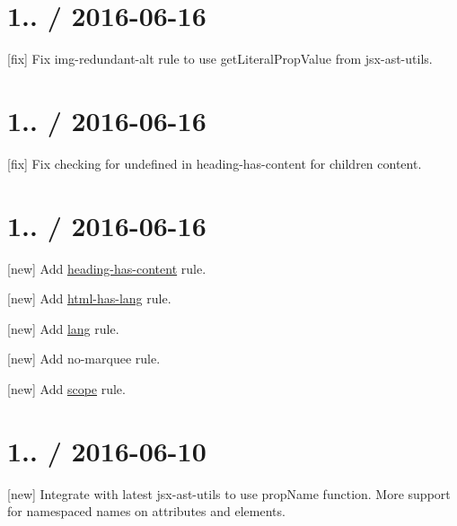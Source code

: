 \section*{1.. / 2016-\/06-\/16 }


\begin{DoxyItemize}
\item \mbox{[}fix\mbox{]} Fix {\ttfamily img-\/redundant-\/alt} rule to use {\ttfamily get\+Literal\+Prop\+Value} from {\ttfamily jsx-\/ast-\/utils}.
\end{DoxyItemize}

\section*{1.. / 2016-\/06-\/16 }


\begin{DoxyItemize}
\item \mbox{[}fix\mbox{]} Fix checking for undefined in {\ttfamily heading-\/has-\/content} for children content.
\end{DoxyItemize}

\section*{1.. / 2016-\/06-\/16 }


\begin{DoxyItemize}
\item \mbox{[}new\mbox{]} Add \mbox{\hyperlink{heading-has-content_8md}{heading-\/has-\/content}} rule.
\item \mbox{[}new\mbox{]} Add \mbox{\hyperlink{html-has-lang_8md}{html-\/has-\/lang}} rule.
\item \mbox{[}new\mbox{]} Add \mbox{\hyperlink{lang_8md}{lang}} rule.
\item \mbox{[}new\mbox{]} Add no-\/marquee rule.
\item \mbox{[}new\mbox{]} Add \mbox{\hyperlink{scope_8md}{scope}} rule.
\end{DoxyItemize}

\section*{1.. / 2016-\/06-\/10 }


\begin{DoxyItemize}
\item \mbox{[}new\mbox{]} Integrate with latest {\ttfamily jsx-\/ast-\/utils} to use {\ttfamily prop\+Name} function. More support for namespaced names on attributes and elements.
\end{DoxyItemize}

